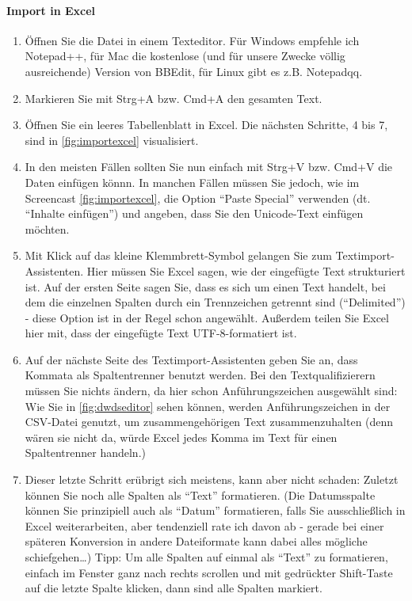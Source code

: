 \documentclass[]{article}
\let\oldparagraph\paragraph
\renewcommand{\paragraph}[1]{\oldparagraph{#1}\mbox{}}
\begin{document}
\hypertarget{import-in-excel}{\paragraph{Import in
Excel}\label{import-in-excel}}

\begin{enumerate}
\def\labelenumi{\arabic{enumi}.}
\item
  Öffnen Sie die Datei in einem Texteditor. Für Windows empfehle ich
  Notepad++, für Mac die kostenlose (und für unsere Zwecke völlig
  ausreichende) Version von BBEdit, für Linux gibt es z.B. Notepadqq.
\item
  Markieren Sie mit Strg+A bzw. Cmd+A den gesamten Text.
\item
  Öffnen Sie ein leeres Tabellenblatt in Excel. Die nächsten Schritte, 4
  bis 7, sind in \ref{fig:importexcel} visualisiert.
\item
  In den meisten Fällen sollten Sie nun einfach mit Strg+V bzw. Cmd+V
  die Daten einfügen könnn. In manchen Fällen müssen Sie jedoch, wie im
  Screencast \ref{fig:importexcel}, die Option ``Paste Special''
  verwenden (dt. ``Inhalte einfügen'') und angeben, dass Sie den
  Unicode-Text einfügen möchten.
\item
  Mit Klick auf das kleine Klemmbrett-Symbol gelangen Sie zum
  Textimport-Assistenten. Hier müssen Sie Excel sagen, wie der
  eingefügte Text strukturiert ist. Auf der ersten Seite sagen Sie, dass
  es sich um einen Text handelt, bei dem die einzelnen Spalten durch ein
  Trennzeichen getrennt sind (``Delimited'') - diese Option ist in der
  Regel schon angewählt. Außerdem teilen Sie Excel hier mit, dass der
  eingefügte Text UTF-8-formatiert ist.
\item
  Auf der nächste Seite des Textimport-Assistenten geben Sie an, dass
  Kommata als Spaltentrenner benutzt werden. Bei den Textqualifizierern
  müssen Sie nichts ändern, da hier schon Anführungszeichen ausgewählt
  sind: Wie Sie in \ref{fig:dwdseditor} sehen können, werden
  Anführungszeichen in der CSV-Datei genutzt, um zusammengehörigen Text
  zusammenzuhalten (denn wären sie nicht da, würde Excel jedes Komma im
  Text für einen Spaltentrenner handeln.)
\item
  Dieser letzte Schritt erübrigt sich meistens, kann aber nicht schaden:
  Zuletzt können Sie noch alle Spalten als ``Text'' formatieren. (Die
  Datumsspalte können Sie prinzipiell auch als ``Datum'' formatieren,
  falls Sie ausschließlich in Excel weiterarbeiten, aber tendenziell
  rate ich davon ab - gerade bei einer späteren Konversion in andere
  Dateiformate kann dabei alles mögliche schiefgehen\ldots{}) Tipp: Um
  alle Spalten auf einmal als ``Text'' zu formatieren, einfach im
  Fenster ganz nach rechts scrollen und mit gedrückter Shift-Taste auf
  die letzte Spalte klicken, dann sind alle Spalten markiert.
\end{enumerate}
\end{document}
